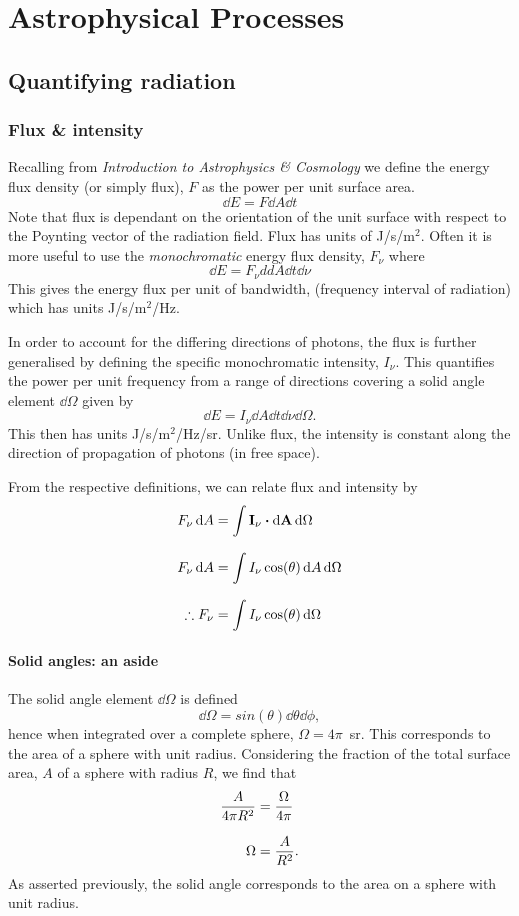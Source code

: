 \chapter{Astrophysical Processes}
\minitoc
\pagebreak
\section{Quantifying radiation}
\subsection{Flux \& intensity}
Recalling from \textit{Introduction to Astrophysics \& Cosmology} we define the energy flux density (or simply flux), \(F\) as the power per unit surface area.
%
\[ \dd{E} = F \dd{A} \dd{t} \]
%
Note that flux is dependant on the orientation of the unit surface with respect to the Poynting vector of the radiation field.
 Flux has units of J/s/m\(^2\).
 Often it is more useful to use the \emph{monochromatic} energy flux density, \(F_\nu\) where
%
\begin{equation}
	\dd{E} = F_\nu dd{A} \dd{t} \dd{\nu}
	\label{eq:AP:def_flux}
\end{equation}
%
This gives the energy flux per unit of bandwidth, (frequency interval of radiation) which has units J/s/m\(^2\)/Hz.
\par 
In order to account for the differing directions of photons, the flux is further generalised by defining the specific monochromatic intensity, \(I_\nu\).
 This quantifies the power per unit frequency from a range of directions covering a solid angle element \(\dd{\Omega}\) given by
%
\begin{equation}
	\dd{E} = I_\nu \dd{A} \dd{t} \dd{\nu} \dd{\Omega}.
	\label{eq:AP:def_intensity}
\end{equation}
%
This then has units J/s/m\(^2\)/Hz/sr.
 Unlike flux, the intensity is constant along the direction of propagation of photons (in free space).
\par
From the respective definitions, we can relate flux and intensity by
%
\begin{align*}
	F_\nu \dd{A} &= \int \vb{I_\nu} \vdot \vb{\dd{A}} \dd{\Omega}
	\linedrop
	F_\nu \dd{A} &= \int I_\nu \cos(\theta) \dd{A} \dd{\Omega}
	\linedrop
	\therefore F_\nu &= \int I_\nu \cos(\theta) \dd{\Omega}
\end{align*}
%
\subsubsection{Solid angles: an aside}
The solid angle element \(\dd{\Omega}\) is defined
%
\[ \dd{\Omega} = sin(\theta) \dd{\theta} \dd{\phi}, \]
%
hence when integrated over a complete sphere, \(\Omega = 4\pi\)~sr.
 This corresponds to the area of a sphere with unit radius.
 Considering the fraction of the total surface area, \(A\) of a sphere with radius \(R\), we find that
%
\begin{align}
	\frac{A}{4\pi R^2} &= \frac{\Omega}{4\pi}
	\linedrop
	\Omega &= \frac{A}{R^2}.
	\label{eq:AP:solid_angle}
\end{align}
%
As asserted previously, the solid angle corresponds to the area on a sphere with unit radius.
%
